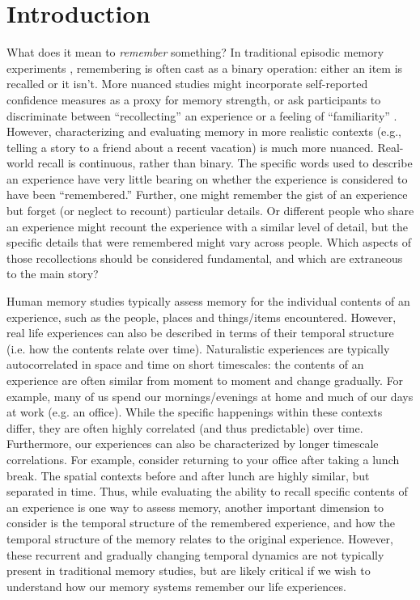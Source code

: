 \documentclass{article}
\begin{document}
{\section{Introduction}

What does it mean to \textit{remember} something? In traditional episodic memory experiments \citep[e.g., list-learning or trial-based experiments;][]{Murd62a, Kaha96}, remembering is often cast as a binary operation: either an item is recalled or it isn't. More nuanced studies might incorporate self-reported confidence measures as a proxy for memory strength, or ask participants to discriminate between ``recollecting'' an experience or a feeling of ``familiarity'' \citep{Yone02}. However, characterizing and evaluating memory in more realistic contexts (e.g., telling a story to a friend about a recent vacation) is much more nuanced. Real-world recall is continuous, rather than binary.  The specific words used to describe an experience have very little bearing on whether the experience is considered to have been ``remembered.''  Further, one might remember the gist of an experience but forget (or neglect to recount) particular details.  Or different people who share an experience might recount the experience with a similar level of detail, but the specific details that were remembered might vary across people.  Which aspects of those recollections should be considered fundamental, and which are extraneous to the main story?

Human memory studies typically assess memory for the individual contents of an experience, such as the people, places and things/items encountered. However, real life experiences can also be described in terms of their temporal structure (i.e. how the contents relate over time).  Naturalistic experiences are typically autocorrelated in space and time on short timescales: the contents of an experience are often similar from moment to moment and change gradually. For example, many of us spend our mornings/evenings at home and much of our days at work (e.g. an office). While the specific happenings within these contexts differ, they are often highly correlated (and thus predictable) over time. Furthermore, our experiences can also be characterized by longer timescale correlations. For example, consider returning to your office after taking a lunch break. The spatial contexts before and after lunch are highly similar, but separated in time. Thus, while evaluating the ability to recall specific contents of an experience is one way to assess memory, another important dimension to consider is the temporal structure of the remembered experience, and how the temporal structure of the memory relates to the original experience. However, these recurrent and gradually changing temporal dynamics are not typically present in traditional memory studies, but are likely critical if we wish to understand how our memory systems remember our life experiences.

}
\end{document}
